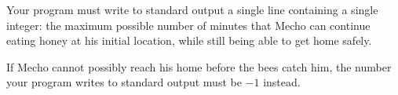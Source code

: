 Your program must write to standard output a single line containing a single integer: the maximum possible number of minutes that Mecho can continue eating honey at his initial location, while still being able to get home safely.

If Mecho cannot possibly reach his home before the bees catch him, the number your program writes to standard output must be $-1$ instead.